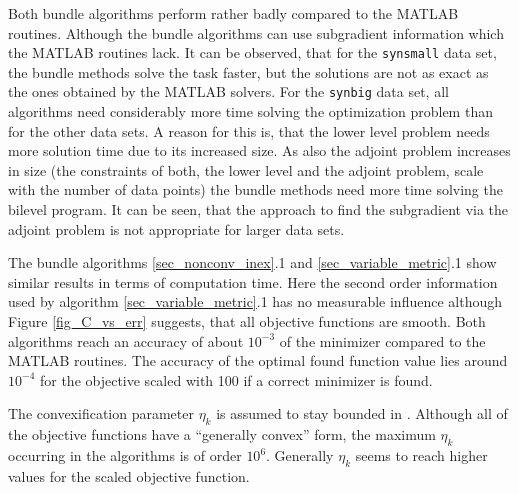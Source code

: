 Both bundle algorithms perform rather badly compared to the MATLAB routines. Although the bundle algorithms can use subgradient information which the MATLAB routines lack.
It can be observed, that for the \texttt{synsmall} data set, the bundle methods solve the task faster, but the solutions are not as exact as the ones obtained by the MATLAB solvers.
For the \texttt{synbig} data set, all algorithms need considerably more time solving the optimization problem than for the other data sets.
A reason for this is, that the lower level problem needs more solution time due to its increased size.
As also the adjoint problem increases in size (the constraints of both, the lower level and the adjoint problem, scale with the number of data points) the bundle methods need more time solving the bilevel program.
It can be seen, that the approach to find the subgradient via the adjoint problem is not appropriate for larger data sets.

The bundle algorithms \ref{sec_nonconv_inex}.1 and \ref{sec_variable_metric}.1 show similar results in terms of computation time. Here the second order information used by algorithm \ref{sec_variable_metric}.1 has no measurable influence although Figure \ref{fig_C_vs_err} suggests, that all objective functions are smooth.
Both algorithms reach an accuracy of about \(10^{-3}\) of the minimizer compared to the MATLAB routines. The accuracy of the optimal found function value lies around \(10^{-4}\) for the objective scaled with 100 if a correct minimizer is found.




The convexification parameter \(\eta_k\) is assumed to stay bounded in \cite[p. 11]{Hare2016}. Although all of the objective functions have a ``generally convex'' form, the maximum \(\eta_k\) occurring in the algorithms is of order \(10^{6}\). Generally \(\eta_k\) seems to reach higher values for the scaled objective function.

